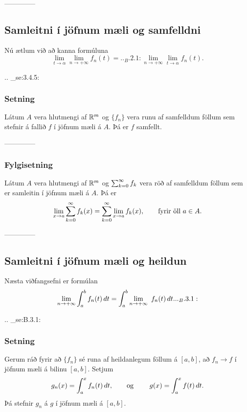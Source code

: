 --------------



\subsection*{Samleitni í jöfnum mæli og samfelldni}

Nú ætlum við að kanna formúluna
 \begin{equation*}\lim_{t\to \alpha}\lim_{n\to+\infty}f_n(t)=

.. _B.2.1:

\lim_{n\to+\infty}\lim_{t\to \alpha}f_n(t). 
 \end{equation*}


.. _se:3.4.5:

\subsubsection{Setning}
 Látum $A$ vera hlutmengi af ${\mathbb R}\sp m$ og $\{f_n\}$ vera runu
af samfelldum föllum sem stefnir á fallið $f$ í jöfnum mæli á $A$.  Þá er
$f$ samfellt.


--------------




\subsubsection{Fylgisetning} 
Látum $A$ vera hlutmengi af ${\mathbb R}\sp m$ og $\sum_{k=0}\sp\infty
f_k$ vera röð af samfelldum föllum  sem er samleitin í jöfnum mæli á $A$.
Þá er 
 $$\lim_{x\to a} \sum\limits_{k=0}\sp\infty f_k(x) =
 \sum\limits_{k=0}\sp\infty \lim_{x\to a}f_k(x), \qquad \text{fyrir
öll $a\in A$.} 
 $$


--------------





\subsection*{Samleitni í jöfnum mæli og heildun}

Næsta viðfangsefni er formúlan
\begin{equation*}
\lim_{n\to+\infty}\int_a \sp b f_n(t)  \, dt=
\int_a \sp b \lim_{n\to+\infty}\
f_n(t) \, dt.

.. _B.3.1:

\end{equation*}


.. _se:B.3.1:

\subsubsection{Setning}
 Gerum ráð fyrir að   $\{f_n\}$ sé runa af  heildanlegum föllum á
$[a,b]$, að $f_n\to f$ í jöfnum mæli á bilinu $[a,b]$.  Setjum 
 $$g_n(x)=\int_a\sp x f_n(t)\, dt, \qquad
\text{og } \qquad g(x)=\int_a\sp x f(t)\, dt.
 $$
Þá stefnir $g_n$ á $ g$ í jöfnum mæli á $[a,b]$.


